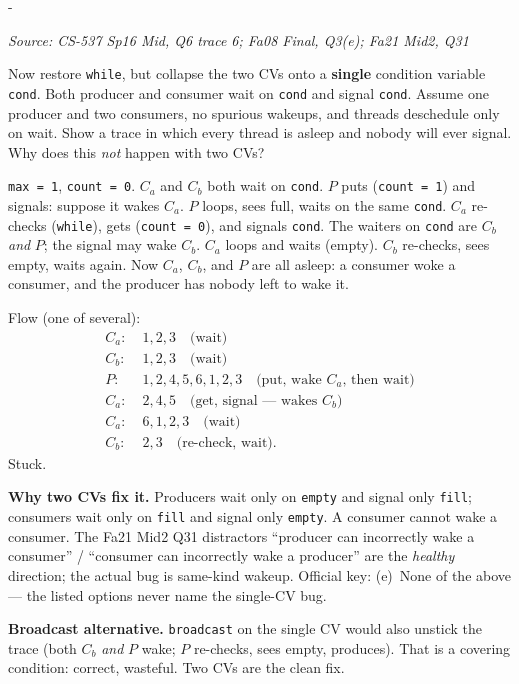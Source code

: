 \documentclass[11pt,a4paper]{article}
\makeatletter
\newcommand{\keepspace}[1]{\par\penalty-100\begingroup
  \setlength{\dimen@}{#1}\dimen@ii\pagegoal\advance\dimen@ii-\pagetotal
  \ifdim\dimen@>\dimen@ii\ifdim\dimen@ii>\z@\vfil\fi\break\fi\endgroup}
\newcounter{qn}[section]
\newenvironment{Qn}[4]{%
  \refstepcounter{qn}\keepspace{7\baselineskip}%
  \begin{tcolorbox}[qboxstyle, title={Q\thesection.\theqn\ \ [#1 \textbar\ #2]\ \ #4}]%
  {\footnotesize\color{g3}\textit{Source: #3}}\par\smallskip%
}{%
  \end{tcolorbox}%
}
\newenvironment{Sol}{%
  \begin{tcolorbox}[sboxstyle, title={Solution}]%
}{%
  \end{tcolorbox}\vspace{0.35em}%
}
\makeatother
\begin{document}
\begin{Qn}{Hard}{Lect 18}{CS-537 Sp16 Mid, Q6 trace 6; Fa08 Final, Q3(e); Fa21 Mid2, Q31}{One CV, even with \texttt{while}: everyone asleep}
Now restore \texttt{while}, but collapse the two CVs onto a
\textbf{single} condition variable \texttt{cond}. Both producer and
consumer wait on \texttt{cond} and signal \texttt{cond}. Assume one
producer and two consumers, no spurious wakeups, and threads deschedule
only on wait. Show a trace in which every thread is asleep and nobody
will ever signal. Why does this \emph{not} happen with two CVs?
\end{Qn}
\begin{Sol}
\texttt{max = 1}, \texttt{count = 0}. $C_a$ and $C_b$ both wait on
\texttt{cond}. $P$ puts (\texttt{count = 1}) and signals: suppose it
wakes $C_a$. $P$ loops, sees full, waits on the same \texttt{cond}.
$C_a$ re-checks (\texttt{while}), gets (\texttt{count = 0}), and
signals \texttt{cond}. The waiters on \texttt{cond} are $C_b$
\emph{and} $P$; the signal may wake $C_b$. $C_a$ loops and waits
(empty). $C_b$ re-checks, sees empty, waits again. Now $C_a$, $C_b$,
and $P$ are all asleep: a consumer woke a consumer, and the producer
has nobody left to wake it.

Flow (one of several):
\[
\begin{aligned}
C_a:&\; 1,2,3 \quad\text{(wait)}\\
C_b:&\; 1,2,3 \quad\text{(wait)}\\
P:&\; 1,2,4,5,6,1,2,3 \quad\text{(put, wake $C_a$, then wait)}\\
C_a:&\; 2,4,5 \quad\text{(get, signal --- wakes $C_b$)}\\
C_a:&\; 6,1,2,3 \quad\text{(wait)}\\
C_b:&\; 2,3 \quad\text{(re-check, wait)}.
\end{aligned}
\]
Stuck.

\textbf{Why two CVs fix it.} Producers wait only on \texttt{empty} and
signal only \texttt{fill}; consumers wait only on \texttt{fill} and
signal only \texttt{empty}. A consumer cannot wake a consumer. The
Fa21 Mid2 Q31 distractors ``producer can incorrectly wake a consumer''
/ ``consumer can incorrectly wake a producer'' are the \emph{healthy}
direction; the actual bug is same-kind wakeup. Official key: (e)~None
of the above --- the listed options never name the single-CV bug.

\textbf{Broadcast alternative.} \texttt{broadcast} on the single CV
would also unstick the trace (both $C_b$ \emph{and} $P$ wake; $P$
re-checks, sees empty, produces). That is a covering condition: correct,
wasteful. Two CVs are the clean fix.
\end{Sol}
\end{document}
